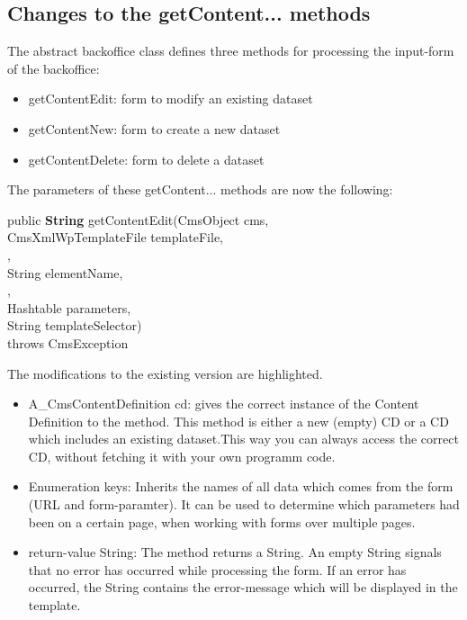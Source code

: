 \subsection{Changes to the getContent... methods}
The abstract backoffice class defines three methods for processing the 
input-form of the backoffice:

\begin{itemize}
\item getContentEdit: form to modify an existing dataset
\item getContentNew:  form to create a new dataset
\item getContentDelete: form to delete a dataset
\end{itemize}

The parameters of these getContent... methods are now the following:

\begin{java}
public {\bf String} getContentEdit(CmsObject cms,\\
\jtabf CmsXmlWpTemplateFile templateFile,\\
,\\
\jtabf String elementName,\\
,\\
\jtabf Hashtable parameters,\\
\jtabf String templateSelector)\\
\jtabf throws CmsException
\end{java}
The modifications to the existing version are highlighted.

\begin{itemize}
\item A\_CmsContentDefinition cd: gives the correct instance of the Content Definition
    to the method. This method is either a new (empty) CD or a CD which includes
    an existing dataset.This way you can always access the correct CD, without 
    fetching it with your own programm code.
\item Enumeration keys: Inherits the names of all data which comes from the form
    (URL and form-paramter). It can be used to determine which parameters had 
    been on a certain page, when working with forms over multiple pages.
\item return-value String: The method returns a String. An empty String signals that
    no error has occurred while processing the form. If an error has occurred, the 
    String contains the error-message which will be displayed in the template.
\end{itemize}

